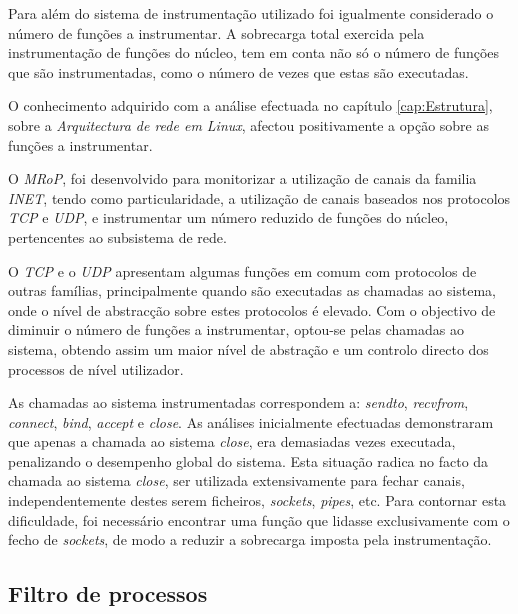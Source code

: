 Para além do sistema de instrumentação utilizado foi igualmente considerado o número de funções a instrumentar.
A sobrecarga total exercida pela instrumentação de funções do núcleo, tem em conta não só o número de funções que são instrumentadas, como o número de vezes que estas são executadas.

O conhecimento adquirido com a análise efectuada no capítulo \ref{cap:Estrutura}, sobre a \textit{Arquitectura de rede em Linux}, afectou positivamente a opção sobre as funções a instrumentar.

O \textit{MRoP}, foi desenvolvido para monitorizar a utilização de canais da familia \textit{INET}, tendo como particularidade, a utilização de canais baseados nos protocolos \textit{TCP} e \textit{UDP}, e instrumentar um número reduzido de funções do núcleo, pertencentes ao subsistema de rede.

O \textit{TCP} e o \textit{UDP} apresentam algumas funções em comum com protocolos de outras famílias, principalmente quando são executadas as chamadas ao sistema, onde o nível de abstracção sobre estes protocolos é elevado.
Com o objectivo de diminuir o número de funções a instrumentar, optou-se pelas chamadas ao sistema, obtendo assim um maior nível de abstração e um controlo directo dos processos de nível utilizador.

As chamadas ao sistema instrumentadas correspondem a: \textit{sendto}, \textit{recvfrom}, \textit{connect}, \textit{bind}, \textit{accept} e \textit{close}.
As análises inicialmente efectuadas demonstraram que apenas a chamada ao sistema \textit{close}, era demasiadas vezes executada, penalizando o desempenho global do sistema.
Esta situação radica no facto da chamada ao sistema \textit{close}, ser utilizada extensivamente para fechar canais, independentemente destes serem ficheiros, \textit{sockets}, \textit{pipes}, etc.
Para contornar esta dificuldade, foi necessário encontrar uma função que lidasse exclusivamente com o fecho de \textit{sockets}, de modo a reduzir a sobrecarga imposta pela instrumentação.



\subsection{Filtro de processos}


